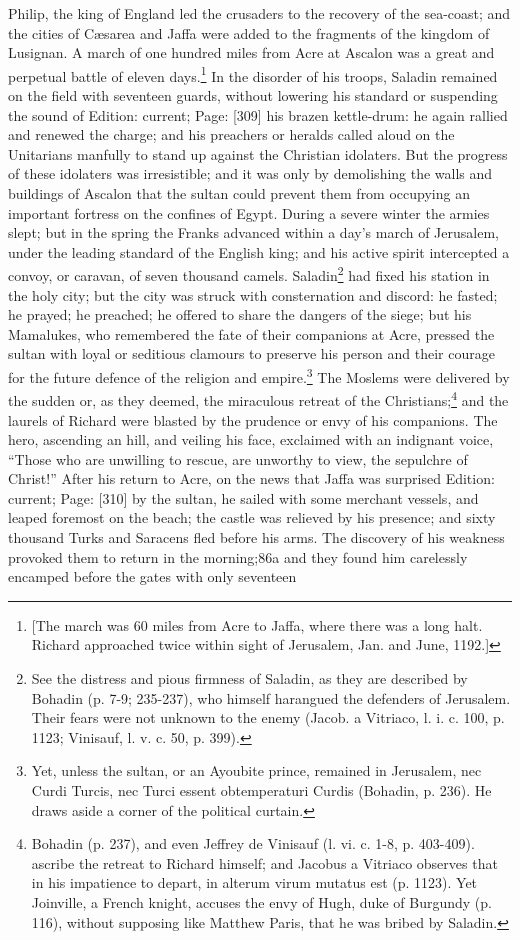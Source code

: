 Philip, the king of England led the crusaders to the recovery of the sea-coast; and the cities of Cæsarea and Jaffa were added to the fragments of the kingdom of Lusignan. A march of one hundred miles from Acre at Ascalon was a great and perpetual battle of eleven days.\footnote{[The march was 60 miles from Acre to Jaffa, where there was a long halt. Richard approached twice within sight of Jerusalem, Jan. and June, 1192.]} In the disorder of his troops, Saladin remained on the field with seventeen guards, without lowering his standard or suspending the sound of Edition: current; Page: [309] his brazen kettle-drum: he again rallied and renewed the charge; and his preachers or heralds called aloud on the Unitarians manfully to stand up against the Christian idolaters. But the progress of these idolaters was irresistible; and it was only by demolishing the walls and buildings of Ascalon that the sultan could prevent them from occupying an important fortress on the confines of Egypt. During a severe winter the armies slept; but in the spring the Franks advanced within a day\texthebrew{}’s march of Jerusalem, under the leading standard of the English king; and his active spirit intercepted a convoy, or caravan, of seven thousand camels. Saladin\footnote{See the distress and pious firmness of Saladin, as they are described by Bohadin (p. 7-9; 235-237), who himself harangued the defenders of Jerusalem. Their fears were not unknown to the enemy (Jacob. a Vitriaco, l. i. c. 100, p. 1123; Vinisauf, l. v. c. 50, p. 399).} had fixed his station in the holy city; but the city was struck with consternation and discord: he fasted; he prayed; he preached; he offered to share the dangers of the siege; but his Mamalukes, who remembered the fate of their companions at Acre, pressed the sultan with loyal or seditious clamours to preserve his person and their courage for the future defence of the religion and empire.\footnote{Yet, unless the sultan, or an Ayoubite prince, remained in Jerusalem, nec Curdi Turcis, nec Turci essent obtemperaturi Curdis (Bohadin, p. 236). He draws aside a corner of the political curtain.} The Moslems were delivered by the sudden or, as they deemed, the miraculous retreat of the Christians;\footnote{Bohadin (p. 237), and even Jeffrey de Vinisauf (l. vi. c. 1-8, p. 403-409). ascribe the retreat to Richard himself; and Jacobus a Vitriaco observes that in his impatience to depart, in alterum virum mutatus est (p. 1123). Yet Joinville, a French knight, accuses the envy of Hugh, duke of Burgundy (p. 116), without supposing like Matthew Paris, that he was bribed by Saladin.} and the laurels of Richard were blasted by the prudence or envy of his companions. The hero, ascending an hill, and veiling his face, exclaimed with an indignant voice, \texthebrew{“}Those who are unwilling to rescue, are unworthy to view, the sepulchre of Christ!\texthebrew{}” After his return to Acre, on the news that Jaffa was surprised Edition: current; Page: [310] by the sultan, he sailed with some merchant vessels, and leaped foremost on the beach; the castle was relieved by his presence; and sixty thousand Turks and Saracens fled before his arms. The discovery of his weakness provoked them to return in the morning;86a and they found him carelessly encamped before the gates with only seventeen 